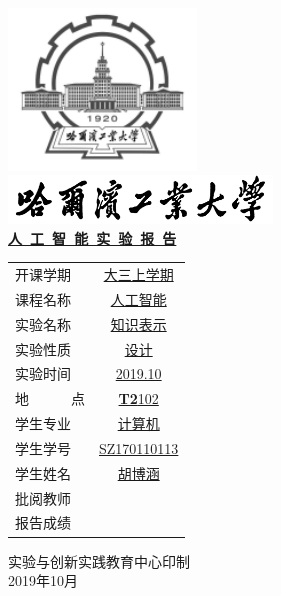 	\begin{titlepage} %
		\begin{center}
                        \includegraphics[width=5cm]{xh.png}\\[0.5cm]
        		\includegraphics[width=7cm]{logo.png}\\[0.5cm]
                		{ \heiti \textbf{\uline{人~工~智~能~实~验~报~告}}\\[0.5cm]}		
        		\vfill
        		\vfill
        		\vfill
        		\vfill
        		\vfill
        		\vfill
        		\vfill
        		\vfill
        		\vfill
        		\vfill
        		\vfill
        		\vfill		
                \vfill        		
                \vfill
        		{\songti
        		\begin{tabular}{lc}
                    开课学期& {\uline{\hfill 大三上学期\hfill}}\\
                    课程名称& {\uline{\hfill 人工智能\hfill}}\\
                    实验名称& {\uline{\hfill 知识表示\hfill}}\\
                    实验性质& {\uline{\hfill 设计\hfill}}\\
                    实验时间& {\uline{\hfill 2019.10\hfill}}\\
                    地~~~~~~点& {\uline{\hfill \textbf{T2}102\hfill}}\\
                    学生专业& {\uline{\hfill 计算机\hfill}}\\
                    学生学号& {\uline{\hfill SZ170110113\hfill}}\\
                    学生姓名& {\uline{\hfill 胡博涵\hfill}}\\
                    批阅教师& {\uline{\hfill \hfill}}\\
                    报告成绩& {\uline{\hfill \hfill}}\\

        		\end{tabular}		}
        		\vfill	
		实验与创新实践教育中心印制\\
2019年10月

		\end{center}
	\end{titlepage}
